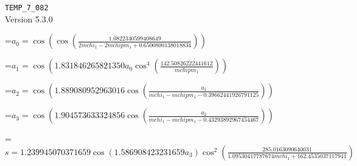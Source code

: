 \documentclass{article}
\newcommand{\exprline}[1]{\par\noindent\begingroup\setbox0=\hbox{$\displaystyle #1$}\ifdim\wd0>\linewidth\resizebox{\linewidth}{!}{\box0}\else\box0\fi\endgroup\par\medskip}
\begin{document}
\noindent\texttt{TEMP\_7\_082}\\
Version 5.3.0\\
\exprline{a_{0} = \cos{\left(\cos{\left(\frac{1.0822340599408649}{2 mchi_{1} - 2 mchipm_{1} + 0.6500800138018834} \right)} \right)}}
\exprline{a_{1} = \cos{\left(1.831846265821350 a_{0} \cos^{4}{\left(\frac{142.50826222441612}{mchipm_{1}} \right)} \right)}}
\exprline{a_{2} = \cos{\left(1.889080952963016 \cos{\left(\frac{a_{1}}{mchi_{1} - mchipm_{1} - 0.39662441926791125} \right)} \right)}}
\exprline{a_{3} = \cos{\left(1.904573633324856 \cos{\left(\frac{a_{2}}{mchi_{1} - mchipm_{1} - 0.43293892967454467} \right)} \right)}}
\exprline{s = 1.239945070371659 \cos{\left(1.586908423231659 a_{3} \right)} \cos^{2}{\left(\frac{285.0163090640031}{1.09530417787674 mchi_{1} + 162.4535037117941} \right)}}
\end{document}
